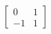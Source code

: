 \documentclass[preview]{standalone}
\begin{document}
\begin{align*}
\begin{bmatrix}0&1\\-1&1\end{bmatrix}
\end{align*}
\end{document}
